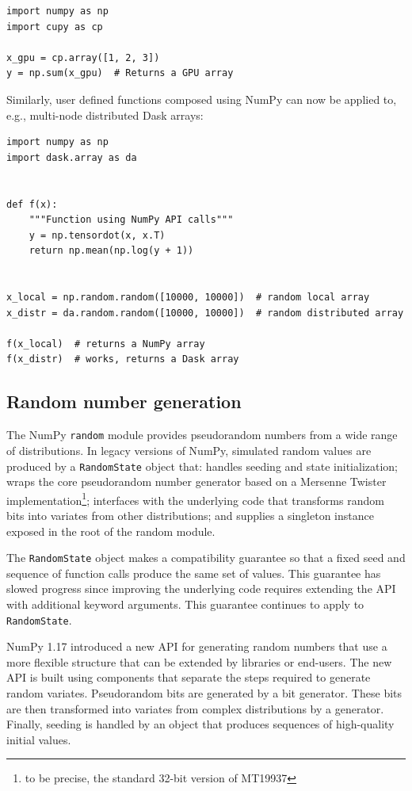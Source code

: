 \documentclass[twocolumn]{article}
\begin{document}
\begin{lstlisting}
import numpy as np
import cupy as cp

x_gpu = cp.array([1, 2, 3])
y = np.sum(x_gpu)  # Returns a GPU array
\end{lstlisting}

Similarly, user defined functions composed using NumPy can now be
applied to, e.g., multi-node distributed Dask arrays:

\begin{lstlisting}
import numpy as np
import dask.array as da


def f(x):
    """Function using NumPy API calls"""
    y = np.tensordot(x, x.T)
    return np.mean(np.log(y + 1))


x_local = np.random.random([10000, 10000])  # random local array
x_distr = da.random.random([10000, 10000])  # random distributed array

f(x_local)  # returns a NumPy array
f(x_distr)  # works, returns a Dask array
\end{lstlisting}

\subsection*{Random number generation}

The NumPy \texttt{random} module provides pseudorandom numbers from a wide range of
distributions. In legacy versions of NumPy, simulated random values are produced
by a \texttt{RandomState} object that: handles seeding and state initialization;
wraps the core pseudorandom number generator based on a Mersenne Twister
implementation\footnote{to be precise, the standard 32-bit version of MT19937};
interfaces with the underlying code that transforms random bits into
variates from other distributions; and supplies a singleton instance exposed in
the root of the random module.

The \texttt{RandomState} object makes a compatibility guarantee so that a fixed
seed and sequence of function calls produce the same set of values. This
guarantee has slowed progress since improving the underlying code requires
extending the API with additional keyword arguments. This guarantee continues to
apply to \texttt{RandomState}.

NumPy 1.17 introduced a new API for generating random numbers that use a more
flexible structure that can be extended by libraries or end-users. The new API
is built using components that separate the steps required to generate random
variates. Pseudorandom bits are generated by a bit generator. These bits are
then transformed into variates from complex distributions by a generator.
Finally, seeding is handled by an object that produces sequences of high-quality
initial values.
\end{document}
